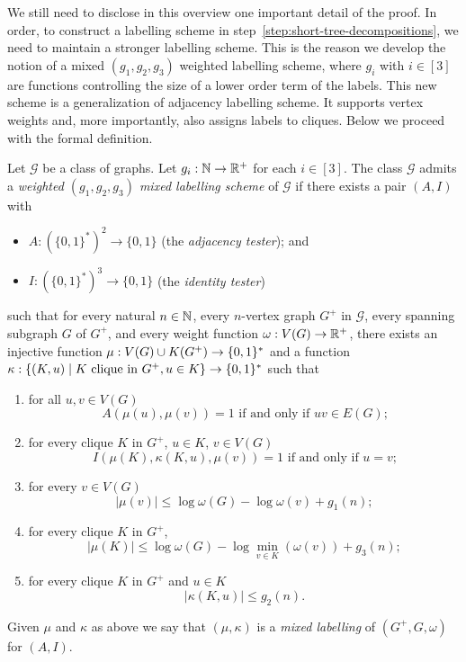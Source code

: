 \documentclass{patmorin}
\renewcommand{\le}{\leqslant}
\renewcommand{\leq}{\leqslant}
\newcommand{\defin}[1]{\emph{\textcolor{brightmaroon}{#1}}}
\DeclarePairedDelimiter{\set}{\{}{\}}
\begin{document}
We still need to disclose in this overview one important detail of the proof. In order, to construct a labelling scheme in step~\ref{step:short-tree-decompositions},
we need to maintain a stronger labelling scheme.
This is the reason we develop the notion of a mixed $(g_1,g_2,g_3)$ weighted labelling scheme, where $g_i$ with $i\in[3]$ are functions controlling the size of a lower order term of the labels.
This new scheme is a generalization of adjacency labelling scheme.
It supports vertex weights and, more importantly, also assigns labels to cliques. Below we proceed with the formal definition.

Let $\mathcal{G}$ be a class of graphs.
Let $g_i:\mathbb{N}\to\mathbb{R}^+$ for each $i\in[3]$.
The class  $\mathcal{G}$ admits a \defin{weighted $(g_1,g_2,g_3)$ mixed labelling scheme} of $\mathcal{G}$ if there exists a pair $(A,I)$ with
\begin{itemize}[nosep,nolistsep]
     \item $A:(\{0,1\}^*)^2\to\{0,1\}$ (the \defin{adjacency tester}); and
     \item $I:(\{0,1\}^*)^3\to\{0,1\}$ (the \defin{identity tester})
\end{itemize}
such that
for every natural $n\in\mathbb{N}$,
every $n$-vertex graph $G^+$ in $\mathcal{G}$,
every spanning subgraph $G$ of $G^+$, and
every weight function $\omega:V(G)\to \mathbb{R}^+$,
there exists an injective function $\mu: V(G)\cup K(G^+) \to \set{0,1}^*$ and a function $\kappa:\{(K, u)\mid \textrm{$K$ clique in $G^+$}, u\in K\}\to \set{0,1}^*$
such that
\begin{enumerate}[nosep,nolistsep,label=(\roman*)]
    \item for all $u,v\in V(G)$
    \[
    \textrm{$A(\mu(u),\mu(v))=1$ if and only if $uv\in E(G)$;}
    \]
    \item for every clique $K$ in $G^+$, $u\in K$, $v\in V(G)$
    \[
    \textrm{$I(\mu(K),\kappa(K, u),\mu(v))=1$ if and only if $u=v$;}
    \]
    \item for every $v\in V(G)$
    \[
    |\mu(v)| \leq \log \omega(G) - \log\omega(v) + g_1(n);
    \]
    \item for every clique $K$ in $G^+$,
    \[
    |\mu(K)|\le \log \omega(G) - \log\min_{v\in K}(\omega(v)) + g_3(n);
    \]
    \item  for every clique $K$ in $G^+$ and $u\in K$
    \[
    |\kappa(K, u)| \leq g_2(n).
    \]
\end{enumerate}
Given $\mu$ and $\kappa$  as above we say that $(\mu,\kappa)$ is a \defin{mixed labelling} of $(G^+,G,\omega)$ for $(A,I)$.
\end{document}
